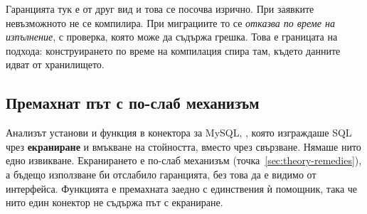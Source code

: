 Гаранцията тук е от друг вид и това се посочва изрично. При заявките невъзможното
не се компилира. При миграциите то се \textit{отказва по време на изпълнение}, с
проверка, която може да съдържа грешка. Това е границата на подхода: конструирането
по време на компилация спира там, където данните идват от хранилището.

\subsection{Премахнат път с по-слаб механизъм}
\label{sec:enf-residual}

Анализът установи и функция в конектора за MySQL, , която
изграждаше SQL чрез \textbf{екраниране} и вмъкване на стойността, вместо чрез
свързване. Нямаше нито едно извикване. Екранирането е по-слаб механизъм
(точка~\ref{sec:theory-remedies}), а бъдещо използване би отслабило гаранцията, без
това да е видимо от интерфейса. Функцията е премахната заедно с единствения ѝ
помощник, така че нито един конектор не съдържа път с екраниране.
